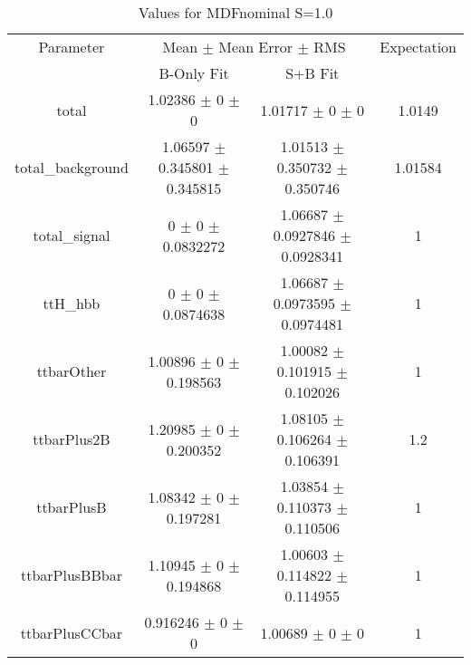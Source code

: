 \begin{table}
\centering
\caption{Values for MDFnominal S=1.0}
\begin{tabular}{cccc}
\toprule
Parameter & \multicolumn{2}{c}{Mean $\pm$ Mean Error $\pm$ RMS} & Expectation\\
 & B-Only Fit & S+B Fit & \\
\midrule
total & \num{1.02386} $\pm$ \num{0} $\pm$ \num{0} & \num{1.01717} $\pm$ \num{0} $\pm$ \num{0} & \num{1.0149}\\
total\_background & \num{1.06597} $\pm$ \num{0.345801} $\pm$ \num{0.345815} & \num{1.01513} $\pm$ \num{0.350732} $\pm$ \num{0.350746} & \num{1.01584}\\
total\_signal & \num{0} $\pm$ \num{0} $\pm$ \num{0.0832272} & \num{1.06687} $\pm$ \num{0.0927846} $\pm$ \num{0.0928341} & \num{1}\\
ttH\_hbb & \num{0} $\pm$ \num{0} $\pm$ \num{0.0874638} & \num{1.06687} $\pm$ \num{0.0973595} $\pm$ \num{0.0974481} & \num{1}\\
ttbarOther & \num{1.00896} $\pm$ \num{0} $\pm$ \num{0.198563} & \num{1.00082} $\pm$ \num{0.101915} $\pm$ \num{0.102026} & \num{1}\\
ttbarPlus2B & \num{1.20985} $\pm$ \num{0} $\pm$ \num{0.200352} & \num{1.08105} $\pm$ \num{0.106264} $\pm$ \num{0.106391} & \num{1.2}\\
ttbarPlusB & \num{1.08342} $\pm$ \num{0} $\pm$ \num{0.197281} & \num{1.03854} $\pm$ \num{0.110373} $\pm$ \num{0.110506} & \num{1}\\
ttbarPlusBBbar & \num{1.10945} $\pm$ \num{0} $\pm$ \num{0.194868} & \num{1.00603} $\pm$ \num{0.114822} $\pm$ \num{0.114955} & \num{1}\\
ttbarPlusCCbar & \num{0.916246} $\pm$ \num{0} $\pm$ \num{0} & \num{1.00689} $\pm$ \num{0} $\pm$ \num{0} & \num{1}\\
\bottomrule
\end{tabular}
\end{table}